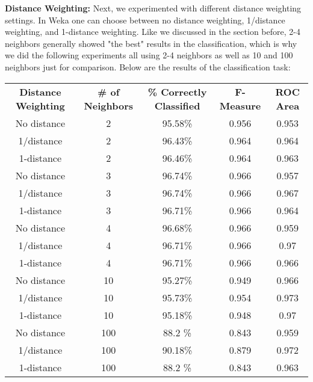 \documentclass{sig-alternate-05-2015}
\begin{document}
{\textbf{Distance Weighting:}
Next, we experimented with different distance weighting settings. In Weka one can choose between no distance weighting, 1/distance weighting, and 1-distance weighting. Like we discussed in the section before, 2-4 neighbors generally showed "the best" results in the classification, which is why we did the following experiments all using 2-4 neighbors as well as 10 and 100 neighbors just for comparison. Below are the results of the classification task:

\begin{center}
\begin{tabular}{c | c | c | c | c}
\textbf{Distance Weighting} & \textbf{\# of Neighbors} & \textbf{\% Correctly Classified} & \textbf{F-Measure} & \textbf{ROC Area}\\
No distance & 2   & 95.58\% & 0.956 & 0.953\\
1/distance  & 2   & 96.43\% & 0.964 & 0.964\\
1-distance  & 2   & 96.46\% & 0.964 & 0.963\\
No distance & 3   & 96.74\% & 0.966 & 0.957\\
1/distance  & 3   & 96.74\% & 0.966 & 0.967\\
1-distance  & 3   & 96.71\% & 0.966 & 0.964\\
No distance & 4   & 96.68\% & 0.966 & 0.959\\
1/distance  & 4   & 96.71\% & 0.966 & 0.97\\
1-distance  & 4   & 96.71\% & 0.966 & 0.966\\
No distance & 10  & 95.27\% & 0.949 & 0.966\\
1/distance  & 10  & 95.73\% & 0.954 & 0.973\\
1-distance  & 10  & 95.18\% & 0.948 & 0.97\\
No distance & 100 & 88.2 \% & 0.843 & 0.959\\
1/distance  & 100 & 90.18\% & 0.879 & 0.972\\
1-distance  & 100 & 88.2 \% & 0.843 & 0.963\\
\end{tabular}
\end{center}

}
\end{document}
